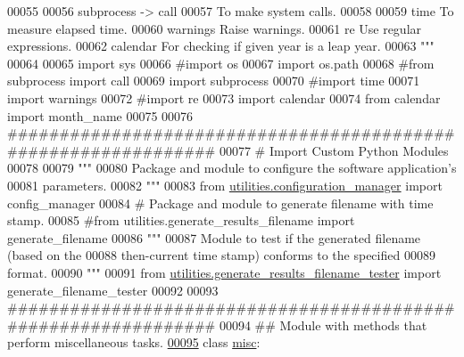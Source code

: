 \begin{DoxyCode}
00055 \textcolor{stringliteral}{}
00056 \textcolor{stringliteral}{    subprocess -> call}
00057 \textcolor{stringliteral}{                To make system calls.}
00058 \textcolor{stringliteral}{}
00059 \textcolor{stringliteral}{    time        To measure elapsed time.}
00060 \textcolor{stringliteral}{    warnings    Raise warnings.}
00061 \textcolor{stringliteral}{    re          Use regular expressions.}
00062 \textcolor{stringliteral}{    calendar    For checking if given year is a leap year.}
00063 \textcolor{stringliteral}{"""}
00064 
00065 \textcolor{keyword}{import} sys
00066 \textcolor{comment}{#import os}
00067 \textcolor{keyword}{import} os.path
00068 \textcolor{comment}{#from subprocess import call}
00069 \textcolor{keyword}{import} subprocess
00070 \textcolor{comment}{#import time}
00071 \textcolor{keyword}{import} warnings
00072 \textcolor{comment}{#import re}
00073 \textcolor{keyword}{import} calendar
00074 \textcolor{keyword}{from} calendar \textcolor{keyword}{import} month\_name
00075 
00076 \textcolor{comment}{###############################################################}
00077 \textcolor{comment}{#   Import Custom Python Modules}
00078 
00079 \textcolor{stringliteral}{"""}
00080 \textcolor{stringliteral}{    Package and module to configure the software application's}
00081 \textcolor{stringliteral}{        parameters.}
00082 \textcolor{stringliteral}{"""}
00083 \textcolor{keyword}{from} \hyperlink{namespaceutilities_1_1configuration__manager}{utilities.configuration\_manager} \textcolor{keyword}{import} config\_manager
00084 \textcolor{comment}{# Package and module to generate filename with time stamp.}
00085 \textcolor{comment}{#from utilities.generate\_results\_filename import generate\_filename}
00086 \textcolor{stringliteral}{"""}
00087 \textcolor{stringliteral}{    Module to test if the generated filename (based on the}
00088 \textcolor{stringliteral}{        then-current time stamp) conforms to the specified}
00089 \textcolor{stringliteral}{        format.}
00090 \textcolor{stringliteral}{"""}
00091 \textcolor{keyword}{from} \hyperlink{namespaceutilities_1_1generate__results__filename__tester}{utilities.generate\_results\_filename\_tester} \textcolor{keyword}{import} 
      generate\_filename\_tester
00092 
00093 \textcolor{comment}{###############################################################}
00094 \textcolor{comment}{##  Module with methods that perform miscellaneous tasks.}
\hypertarget{miscellaneous_8py_source_l00095}{}\hyperlink{classutilities_1_1miscellaneous_1_1misc}{00095} \textcolor{keyword}{class }\hyperlink{classutilities_1_1miscellaneous_1_1misc}{misc}:

\end{DoxyCode}
